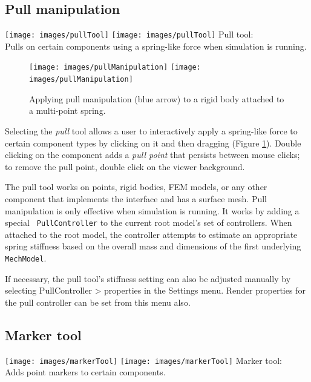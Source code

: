 \documentclass{article}
\begin{document}
\subsection{Pull manipulation}
\label{PullControllerSec}

\vspace{\parskip}
\iflatexml
\phantom{.}\texttt{[image: images/pullTool]}
\else
\texttt{[image: images/pullTool]}
\fi
{\sf Pull tool:}\\
Pulls on certain components using a spring-like force
when simulation is running.

\begin{figure}[h]
\begin{center}
\iflatexml
\texttt{[image: images/pullManipulation]}
\else
\texttt{[image: images/pullManipulation]}
\fi
\end{center}
\caption{Applying pull manipulation (blue arrow) to a rigid body 
attached to a multi-point spring.}%
\label{PullManipulationFig}
\end{figure}

Selecting the {\it pull} tool allows a user to interactively apply a
spring-like force to certain component types by clicking on it and
then dragging (Figure \ref{PullManipulationFig}). Double clicking on
the component adds a {\it pull point} that persists between mouse
clicks; to remove the pull point, double click on the viewer
background.

The pull tool works on points, rigid bodies, FEM models, or any other
component that implements the
 interface and
has a surface mesh. Pull manipulation is only effective when
simulation is running.  It works by adding a special {\tt
PullController} to the current root model's set of controllers. When
attached to the root model, the controller attempts to estimate an
appropriate spring stiffness based on the overall mass and dimensions
of the first underlying {\tt MechModel}.

If necessary, the pull tool's stiffness setting can also be adjusted
manually by selecting {\sf PullController > properties} in the {\sf
Settings} menu.  Render properties for the pull controller can be set
from this menu also.

\subsection{Marker tool}
\label{MarkerTool}

\vspace{\parskip}
\iflatexml
\phantom{.}\texttt{[image: images/markerTool]}
\else
\texttt{[image: images/markerTool]}
\fi
{\sf Marker tool:}\\
Adds point markers to certain components.
\end{document}
